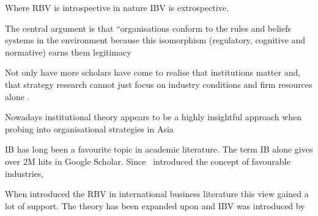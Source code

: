Where \gls{RBV}  is introspective in nature \gls{IBV} is extrospective.


The central argument is that “organisations conform to the rules and beliefs systems in the environment because this isomorphism (regulatory, cognitive and normative) earns them legitimacy


Not only have more scholars have come to realise that institutions matter and, that strategy research cannot just focus on industry conditions and firm resources alone \cite{Powell:1991,Scott:2001}.

Nowadays institutional theory appears to be a highly insightful approach when probing into organisational strategies in Asia~\cite{Hoskisson:2000}


\Gls{IB} has long been a favourite topic in academic literature. The term \gls{IB} alone gives over 2M hits in Google Scholar. Since~\cite{Porter:1980} introduced the concept of favourable industries, 

When introduced the \gls{RBV} in international business literature this view gained a lot of support. 
The theory has been expanded upon and \gls{IBV} was introduced by \cite{Kostova:1999,Meyer:2009,Wang:2012}